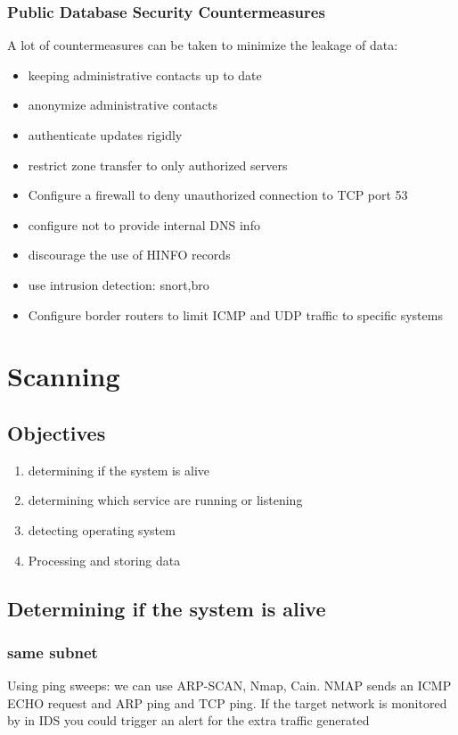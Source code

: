 \subsection{Public Database Security Countermeasures}
A lot of countermeasures can be taken to minimize the leakage of data:
\begin{itemize}
    \item keeping administrative contacts up to date
    \item anonymize administrative contacts
    \item authenticate updates rigidly
    \item restrict zone transfer to only authorized servers
    \item Configure a firewall to deny unauthorized connection to TCP port 53
    \item configure not to provide internal DNS info
    \item discourage the use of HINFO records
    \item use intrusion detection: snort,bro
    \item Configure border routers to limit ICMP and UDP traffic to specific systems
\end{itemize}


\chapter{Scanning}
\section{Objectives}

\begin{enumerate}
    \item  determining if the system is alive
    \item determining which service are running or listening
    \item detecting operating system 
    \item Processing and storing data
\end{enumerate}


\section{Determining if the system is alive}
\subsection{same subnet}
Using ping sweeps: we can use ARP-SCAN, Nmap, Cain.
NMAP sends an ICMP ECHO request and ARP ping and TCP ping. If the target network is monitored by in IDS you could trigger an alert for the extra traffic generated

